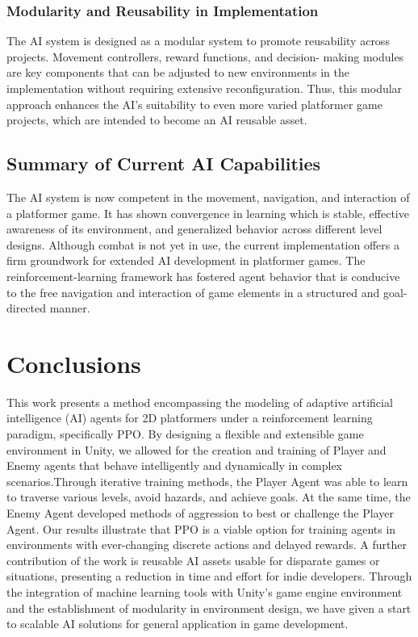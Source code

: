 \documentclass[12pt,oneside,openright,a4paper]{cpe-english-project}
\begin{document}
\subsection{Modularity and Reusability in Implementation}
The AI system is designed as a modular system to promote reusability across projects. Movement controllers, reward functions, and decision- making modules are key components that can be adjusted to new environments in the implementation without requiring extensive reconfiguration. Thus, this modular approach enhances the AI's suitability to even more varied platformer game projects, which are intended to become an AI reusable asset.
\section{Summary of Current AI Capabilities}
The AI system is now competent in the movement, navigation, and interaction of a platformer game. It has shown convergence in learning which is stable, effective awareness of its environment, and generalized behavior across different level designs. Although combat is not yet in use, the current implementation offers a firm groundwork for extended AI development in platformer games. The reinforcement-learning framework has fostered agent behavior that is conducive to the free navigation and interaction of game elements in a structured and goal-directed manner.


\chapter{Conclusions}
This work presents a method encompassing the modeling of adaptive artificial intelligence (AI) agents for 2D platformers under a reinforcement learning paradigm, specifically PPO. By designing a flexible and extensible game environment in Unity, we allowed for the creation and training of Player and Enemy agents that behave intelligently and dynamically in complex scenarios.Through iterative training methods, the Player Agent was able to learn to traverse various levels, avoid hazards, and achieve goals. At the same time, the Enemy Agent developed methods of aggression to best or challenge the Player Agent. Our results illustrate that PPO is a viable option for training agents in environments with ever-changing discrete actions and delayed rewards. A further contribution of the work is reusable AI assets usable for disparate games or situations, presenting a reduction in time and effort for indie developers. Through the integration of machine learning tools with Unity's game engine environment and the establishment of modularity in environment design, we have given a start to scalable AI solutions for general application in game development.
\end{document}
